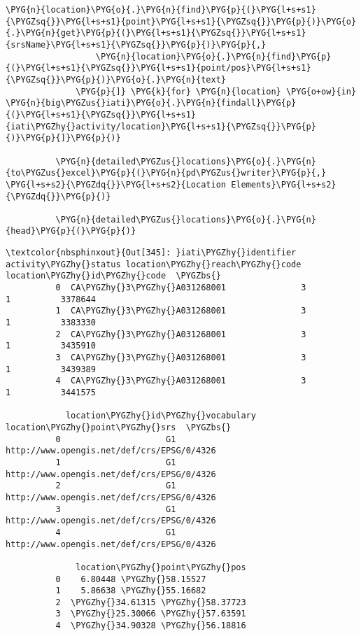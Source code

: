 \documentclass[letterpaper,10pt,english]{sphinxmanual}
\begin{document}
\begin{Verbatim}[commandchars=\\\{\}]
                  \PYG{n}{location}\PYG{o}{.}\PYG{n}{find}\PYG{p}{(}\PYG{l+s+s1}{\PYGZsq{}}\PYG{l+s+s1}{point}\PYG{l+s+s1}{\PYGZsq{}}\PYG{p}{)}\PYG{o}{.}\PYG{n}{get}\PYG{p}{(}\PYG{l+s+s1}{\PYGZsq{}}\PYG{l+s+s1}{srsName}\PYG{l+s+s1}{\PYGZsq{}}\PYG{p}{)}\PYG{p}{,}
                  \PYG{n}{location}\PYG{o}{.}\PYG{n}{find}\PYG{p}{(}\PYG{l+s+s1}{\PYGZsq{}}\PYG{l+s+s1}{point/pos}\PYG{l+s+s1}{\PYGZsq{}}\PYG{p}{)}\PYG{o}{.}\PYG{n}{text}
              \PYG{p}{]} \PYG{k}{for} \PYG{n}{location} \PYG{o+ow}{in} \PYG{n}{big\PYGZus{}iati}\PYG{o}{.}\PYG{n}{findall}\PYG{p}{(}\PYG{l+s+s1}{\PYGZsq{}}\PYG{l+s+s1}{iati\PYGZhy{}activity/location}\PYG{l+s+s1}{\PYGZsq{}}\PYG{p}{)}\PYG{p}{]}\PYG{p}{)}
          
          \PYG{n}{detailed\PYGZus{}locations}\PYG{o}{.}\PYG{n}{to\PYGZus{}excel}\PYG{p}{(}\PYG{n}{pd\PYGZus{}writer}\PYG{p}{,} \PYG{l+s+s2}{\PYGZdq{}}\PYG{l+s+s2}{Location Elements}\PYG{l+s+s2}{\PYGZdq{}}\PYG{p}{)}
          
          \PYG{n}{detailed\PYGZus{}locations}\PYG{o}{.}\PYG{n}{head}\PYG{p}{(}\PYG{p}{)}
\end{Verbatim}

\begin{Verbatim}[commandchars=\\\{\}]
\textcolor{nbsphinxout}{Out[345]: }iati\PYGZhy{}identifier activity\PYGZhy{}status location\PYGZhy{}reach\PYGZhy{}code location\PYGZhy{}id\PYGZhy{}code  \PYGZbs{}
          0  CA\PYGZhy{}3\PYGZhy{}A031268001               3                   1          3378644
          1  CA\PYGZhy{}3\PYGZhy{}A031268001               3                   1          3383330
          2  CA\PYGZhy{}3\PYGZhy{}A031268001               3                   1          3435910
          3  CA\PYGZhy{}3\PYGZhy{}A031268001               3                   1          3439389
          4  CA\PYGZhy{}3\PYGZhy{}A031268001               3                   1          3441575
          
            location\PYGZhy{}id\PYGZhy{}vocabulary                          location\PYGZhy{}point\PYGZhy{}srs  \PYGZbs{}
          0                     G1  http://www.opengis.net/def/crs/EPSG/0/4326
          1                     G1  http://www.opengis.net/def/crs/EPSG/0/4326
          2                     G1  http://www.opengis.net/def/crs/EPSG/0/4326
          3                     G1  http://www.opengis.net/def/crs/EPSG/0/4326
          4                     G1  http://www.opengis.net/def/crs/EPSG/0/4326
          
              location\PYGZhy{}point\PYGZhy{}pos
          0    6.80448 \PYGZhy{}58.15527
          1    5.86638 \PYGZhy{}55.16682
          2  \PYGZhy{}34.61315 \PYGZhy{}58.37723
          3  \PYGZhy{}25.30066 \PYGZhy{}57.63591
          4  \PYGZhy{}34.90328 \PYGZhy{}56.18816
\end{Verbatim}
\end{document}
